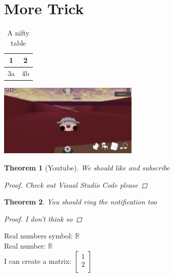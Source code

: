 \documentclass{article}
\newtheorem{theorem}{Theorem}[section]
\newcommand{\R}{\mathbb{R}}
\newcommand{\cv}[2]{\begin{bmatrix}
    #1\\
    #2\\
\end{bmatrix}}
\begin{document}
\section{More Trick}
\begin{table}
\caption{A nifty table}
\begin{center}
\begin{tabular}{|c|c|}
    \hline
    1&2 \\ \hline
    3a&4b \\ \hline
\end{tabular}
\end{center}
\end{table}
\includegraphics[width=0.5\textwidth]{sakuya.png}
\begin{theorem}[Youtube]
We should like and subscribe 
\begin{proof}
    Check out Visual Studio Code please
\end{proof}
\end{theorem}
\begin{theorem}
    You should ring the notification too
\begin{proof}
    I don't think so
\end{proof}
\end{theorem}
Real numbers symbol: $\mathbb{R}$ \\
Real number: $\R$ \\
I can create a matrix: $\cv{1}{2}$
\end{document}
